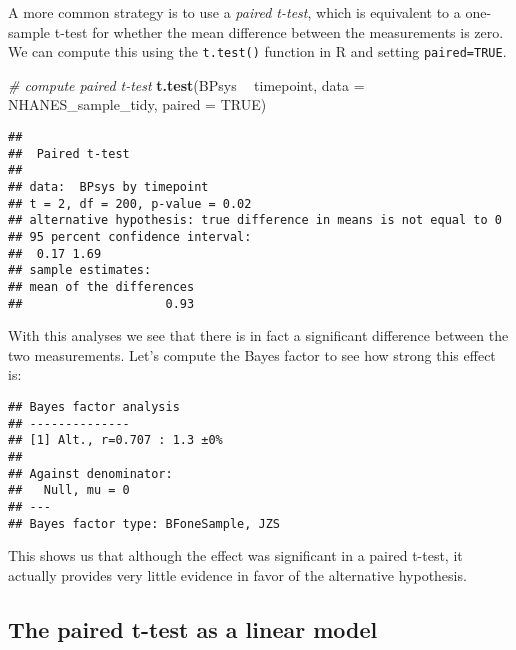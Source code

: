 \documentclass[]{book}
\newenvironment{Shaded}{\begin{snugshade}}{\end{snugshade}}
\newcommand{\KeywordTok}[1]{\textcolor[rgb]{0.13,0.29,0.53}{\textbf{#1}}}
\newcommand{\DataTypeTok}[1]{\textcolor[rgb]{0.13,0.29,0.53}{#1}}
\newcommand{\StringTok}[1]{\textcolor[rgb]{0.31,0.60,0.02}{#1}}
\newcommand{\CommentTok}[1]{\textcolor[rgb]{0.56,0.35,0.01}{\textit{#1}}}
\newcommand{\OtherTok}[1]{\textcolor[rgb]{0.56,0.35,0.01}{#1}}
\newcommand{\OperatorTok}[1]{\textcolor[rgb]{0.81,0.36,0.00}{\textbf{#1}}}
\newcommand{\NormalTok}[1]{#1}
\theoremstyle{definition}
\theoremstyle{definition}
\theoremstyle{definition}
\theoremstyle{remark}
\begin{document}
A more common strategy is to use a \emph{paired t-test}, which is
equivalent to a one-sample t-test for whether the mean difference
between the measurements is zero. We can compute this using the
\texttt{t.test()} function in R and setting \texttt{paired=TRUE}.

\begin{Shaded}
\begin{Highlighting}[]
\CommentTok{# compute paired t-test}
\KeywordTok{t.test}\NormalTok{(BPsys }\OperatorTok{~}\StringTok{ }\NormalTok{timepoint, }\DataTypeTok{data =}\NormalTok{ NHANES_sample_tidy, }\DataTypeTok{paired =} \OtherTok{TRUE}\NormalTok{)}
\end{Highlighting}
\end{Shaded}

\begin{verbatim}
## 
##  Paired t-test
## 
## data:  BPsys by timepoint
## t = 2, df = 200, p-value = 0.02
## alternative hypothesis: true difference in means is not equal to 0
## 95 percent confidence interval:
##  0.17 1.69
## sample estimates:
## mean of the differences 
##                    0.93
\end{verbatim}

With this analyses we see that there is in fact a significant difference
between the two measurements. Let's compute the Bayes factor to see how
strong this effect is:

\begin{Shaded}
\end{Shaded}

\begin{verbatim}
## Bayes factor analysis
## --------------
## [1] Alt., r=0.707 : 1.3 ±0%
## 
## Against denominator:
##   Null, mu = 0 
## ---
## Bayes factor type: BFoneSample, JZS
\end{verbatim}

This shows us that although the effect was significant in a paired
t-test, it actually provides very little evidence in favor of the
alternative hypothesis.

\subsection{The paired t-test as a linear
model}\label{the-paired-t-test-as-a-linear-model}
\end{document}
